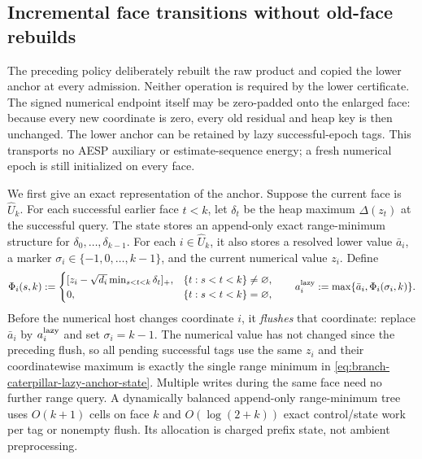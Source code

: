\subsection{Incremental face transitions without old-face rebuilds}
\label{sec:branch-caterpillar-incremental-face-transition}

The preceding policy deliberately rebuilt the raw product and copied the
lower anchor at every admission.  Neither operation is required by the lower
certificate.  The signed numerical endpoint itself may be zero-padded onto
the enlarged face: because every new coordinate is zero, every old residual
and heap key is then unchanged.  The lower anchor can be retained by lazy
successful-epoch tags.  This transports no AESP auxiliary or
estimate-sequence energy; a fresh numerical epoch is still initialized on
every face.

We first give an exact representation of the anchor.  Suppose the current
face is $\widehat U_k$.  For each successful earlier face $t<k$, let
$\delta_t$ be the heap maximum $\Delta(z_t)$ at the successful query.  The
state stores an append-only exact range-minimum structure for
$\delta_0,\ldots,\delta_{k-1}$.  For each $i\in\widehat U_k$, it also stores a
resolved lower value $\bar a_i$, a marker
$\sigma_i\in\{-1,0,\ldots,k-1\}$, and the current numerical value $z_i$.
Define
\begin{equation}
 \Phi_i(s,k):=
 \begin{cases}
  [z_i-\sqrt{d_i}\min_{s<t<k}\delta_t]_+,&
      \{t:s<t<k\}\ne\varnothing,\\
  0,&\{t:s<t<k\}=\varnothing,
 \end{cases}
 \qquad
 a_i^{\rm lazy}:=\max\{\bar a_i,\Phi_i(\sigma_i,k)\}.
 \label{eq:branch-caterpillar-lazy-anchor-state}
\end{equation}
Before the numerical host changes coordinate $i$, it \emph{flushes} that
coordinate: replace $\bar a_i$ by $a_i^{\rm lazy}$ and set
$\sigma_i=k-1$.  The numerical value has not changed since the preceding
flush, so all pending successful tags use the same $z_i$ and their
coordinatewise maximum is exactly the single range minimum in
\cref{eq:branch-caterpillar-lazy-anchor-state}.  Multiple writes during the
same face need no further range query.  A dynamically balanced append-only
range-minimum tree uses $O(k+1)$ cells on face $k$ and
$O(\log(2+k))$ exact control/state work per tag or nonempty flush.  Its
allocation is charged prefix state, not ambient preprocessing.

